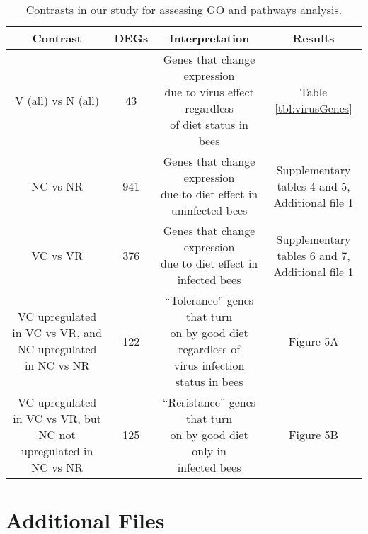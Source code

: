 \documentclass{bmcart}
\begin{document}
\begin{linenumbers}
\begin{backmatter}
\begin{table}[h!]
\begin{tabular}{cccc}
\hline
Contrast & DEGs & Interpretation & Results \\ 
\hline
V (all) vs N (all) & 43 & \makecell{Genes that change expression \\ due to virus effect regardless \\ of diet status in bees} & Table \ref{tbl:virusGenes} \\
\hline
NC vs NR & 941 & \makecell{Genes that change expression \\ due to diet effect in \\ uninfected bees} & \makecell{Supplementary \\ tables 4 and 5, \\ Additional file 1} \\
\hline
VC vs VR & 376 & \makecell{Genes that change expression \\ due to diet effect in \\ infected bees} & \makecell{Supplementary \\ tables 6 and 7, \\ Additional file 1} \\
\hline
\makecell{VC upregulated in VC vs VR, and \\ NC upregulated in NC vs NR} & 122 & \makecell{``Tolerance'' genes that turn \\ on by good diet regardless of \\ virus infection status in bees} & Figure 5A \\
\hline
\makecell{VC upregulated in VC vs VR, but \\ NC not upregulated in NC vs NR} & 125 & \makecell{``Resistance'' genes that turn \\ on by good diet only in \\ infected bees} & Figure 5B \\
\hline
\end{tabular}
\caption{Contrasts in our study for assessing GO and pathways analysis.}
  \label{tbl:contrasts}
\end{table}

\newpage
\section*{Additional Files}


\end{backmatter}
\end{linenumbers}
\end{document}
